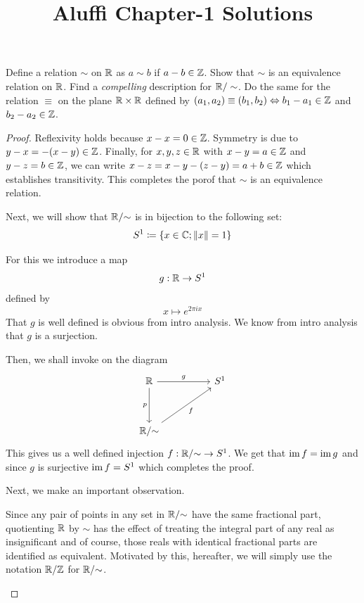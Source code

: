 \documentclass{article}
\title{Aluffi Chapter-1 Solutions}
\begin{document}
\maketitle

\begin{ex}\label{ex:rmodziscirclegroup}
  \cite[Ex-1.6]{aluffi_algebra_2009}
  Define a relation \(\sim\) on \(\mathbb{R}\) as \(a \sim b\) if \(a-b\in \mathbb{Z}\). 
  Show that \(\sim\) is an equivalence relation on \(\mathbb{R}\). Find a \emph{compelling} 
  description for \(\mathbb{R}/\sim\). Do the same for the relation \(\equiv\) 
  on the plane \(\mathbb{R}\times \mathbb{R}\) defined by \((a_{1}, a_{2}) \equiv (b_{1}, b_{2}) \Leftrightarrow b_{1}-a_{1} \in \mathbb{Z}\) and \(b_{2}-a_{2}\in \mathbb{Z}\).
\end{ex}
\begin{proof}
  Reflexivity holds because \(x-x=0\in \mathbb{Z}\).
  Symmetry is due to \(y-x = -(x-y)\in \mathbb{Z}\).
  Finally, for \(x,y,z \in \mathbb{R}\) with \(x - y = a \in \mathbb{Z}\) and \(y - z = b \in \mathbb{Z}\), 
  we can write \(x - z = x - y - (z - y) = a + b \in \mathbb{Z}\) which establishes 
  transitivity. This completes the porof that \(\sim\) is an equivalence relation. 

  Next, we will show that \({{\displaystyle \mathbb{R}}}/{{\displaystyle \sim}}\) is in bijection to the following set: 
  \[
    S^{1} \coloneqq \left\{x \in \mathbb{C}; \|x\| = 1\right\}
  \]

  For this we introduce a map 
  \[
    g : \mathbb{R} \to S^{1}
  \]
  defined by
  \[
    x \mapsto e^{2\pi i x}
  \]
  That \(g\) is well defined is obvious from intro analysis.
  We know from intro analysis that \(g\) is a surjection. 

  Then, we shall invoke \cite[Thm-2.7]{aluffi_algebra_2009} on the diagram
  \[
    \begin{tikzcd}
      \bR && S^{1} \\
      \\
      {\quotient{\bR}{\sim}}
      \arrow["g", from=1-1, to=1-3]
      \arrow["p"', from=1-1, to=3-1]
      \arrow["f"', from=3-1, to=1-3]
    \end{tikzcd}
  \]
  This gives us a well defined injection \(f:{{\displaystyle \mathbb{R}}}/{{\displaystyle \sim}}\to S^{1}\). 
  We get that \(\operatorname{im} f = \operatorname{im} g\) and since \(g\) is surjective \(\operatorname{im} f = S^{1}\)
  which completes the proof.

  Next, we make an important observation. 
  \begin{observe}
    Since any pair of points in any set in \({{\displaystyle \mathbb{R}}}/{{\displaystyle \sim}}\) have the same 
    fractional part, quotienting \(\mathbb{R}\) by \(\sim\) has the effect of 
    treating the integral part of any real as insignificant and of course, those reals with 
    identical fractional parts are identified as equivalent. 
    Motivated by this, hereafter, we will simply use the notation \({{\displaystyle \mathbb{R}}}/{{\displaystyle \mathbb{Z}}}\)
    for \({{\displaystyle \mathbb{R}}}/{{\displaystyle \sim}}\).
  \end{observe}


\end{proof}
\end{document}
